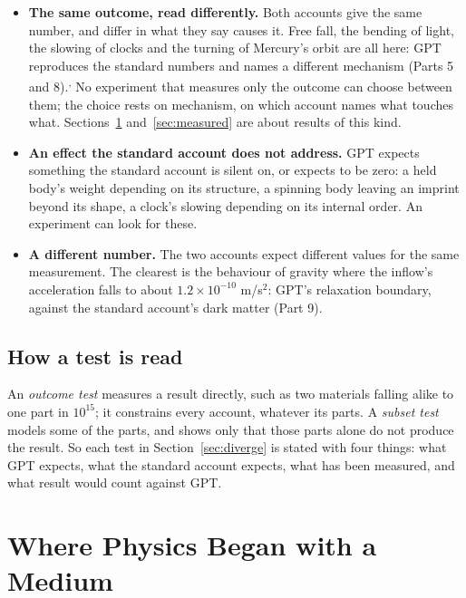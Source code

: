 \documentclass[11pt,a4paper]{article}
\begin{document}
\begin{itemize}
\item \textbf{The same outcome, read differently.} Both accounts give the same number, and differ in what they say causes it. Free fall, the bending of light, the slowing of clocks and the turning of Mercury's orbit are all here: GPT reproduces the standard numbers and names a different mechanism (Parts 5 and 8).\textsuperscript{,} No experiment that measures only the outcome can choose between them; the choice rests on mechanism, on which account names what touches what. Sections~\ref{sec:history} and~\ref{sec:measured} are about results of this kind.
\item \textbf{An effect the standard account does not address.} GPT expects something the standard account is silent on, or expects to be zero: a held body's weight depending on its structure, a spinning body leaving an imprint beyond its shape, a clock's slowing depending on its internal order. An experiment can look for these.
\item \textbf{A different number.} The two accounts expect different values for the same measurement. The clearest is the behaviour of gravity where the inflow's acceleration falls to about $1.2\times10^{-10}$ m/s$^2$: GPT's relaxation boundary, against the standard account's dark matter (Part 9).
\end{itemize}

\subsection{How a test is read}

 An \emph{outcome test} measures a result directly, such as two materials falling alike to one part in $10^{15}$; it constrains every account, whatever its parts. A \emph{subset test} models some of the parts, and shows only that those parts alone do not produce the result. So each test in Section~\ref{sec:diverge} is stated with four things: what GPT expects, what the standard account expects, what has been measured, and what result would count against GPT.

\section{Where Physics Began with a Medium}\label{sec:history}
\end{document}

